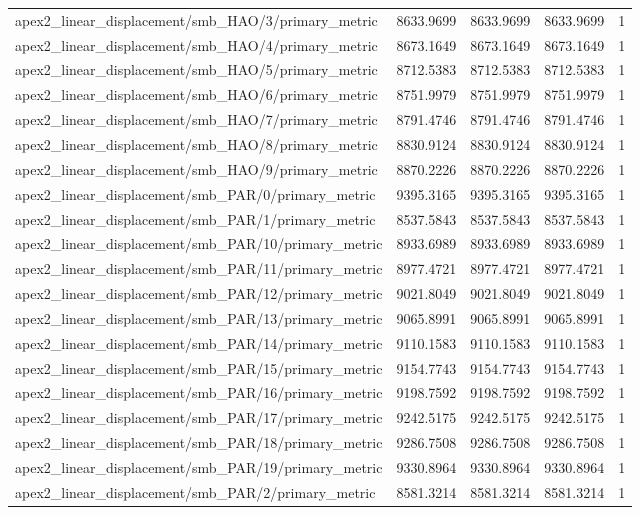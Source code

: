 \begin{table}[h]
\begin{tabular}{lrrrr}
apex2_linear_displacement/smb_HAO/3/primary_metric & 8633.9699 & 8633.9699 & 8633.9699 & 1 \\
apex2_linear_displacement/smb_HAO/4/primary_metric & 8673.1649 & 8673.1649 & 8673.1649 & 1 \\
apex2_linear_displacement/smb_HAO/5/primary_metric & 8712.5383 & 8712.5383 & 8712.5383 & 1 \\
apex2_linear_displacement/smb_HAO/6/primary_metric & 8751.9979 & 8751.9979 & 8751.9979 & 1 \\
apex2_linear_displacement/smb_HAO/7/primary_metric & 8791.4746 & 8791.4746 & 8791.4746 & 1 \\
apex2_linear_displacement/smb_HAO/8/primary_metric & 8830.9124 & 8830.9124 & 8830.9124 & 1 \\
apex2_linear_displacement/smb_HAO/9/primary_metric & 8870.2226 & 8870.2226 & 8870.2226 & 1 \\
apex2_linear_displacement/smb_PAR/0/primary_metric & 9395.3165 & 9395.3165 & 9395.3165 & 1 \\
apex2_linear_displacement/smb_PAR/1/primary_metric & 8537.5843 & 8537.5843 & 8537.5843 & 1 \\
apex2_linear_displacement/smb_PAR/10/primary_metric & 8933.6989 & 8933.6989 & 8933.6989 & 1 \\
apex2_linear_displacement/smb_PAR/11/primary_metric & 8977.4721 & 8977.4721 & 8977.4721 & 1 \\
apex2_linear_displacement/smb_PAR/12/primary_metric & 9021.8049 & 9021.8049 & 9021.8049 & 1 \\
apex2_linear_displacement/smb_PAR/13/primary_metric & 9065.8991 & 9065.8991 & 9065.8991 & 1 \\
apex2_linear_displacement/smb_PAR/14/primary_metric & 9110.1583 & 9110.1583 & 9110.1583 & 1 \\
apex2_linear_displacement/smb_PAR/15/primary_metric & 9154.7743 & 9154.7743 & 9154.7743 & 1 \\
apex2_linear_displacement/smb_PAR/16/primary_metric & 9198.7592 & 9198.7592 & 9198.7592 & 1 \\
apex2_linear_displacement/smb_PAR/17/primary_metric & 9242.5175 & 9242.5175 & 9242.5175 & 1 \\
apex2_linear_displacement/smb_PAR/18/primary_metric & 9286.7508 & 9286.7508 & 9286.7508 & 1 \\
apex2_linear_displacement/smb_PAR/19/primary_metric & 9330.8964 & 9330.8964 & 9330.8964 & 1 \\
apex2_linear_displacement/smb_PAR/2/primary_metric & 8581.3214 & 8581.3214 & 8581.3214 & 1 \\

\end{tabular}
\end{table}
